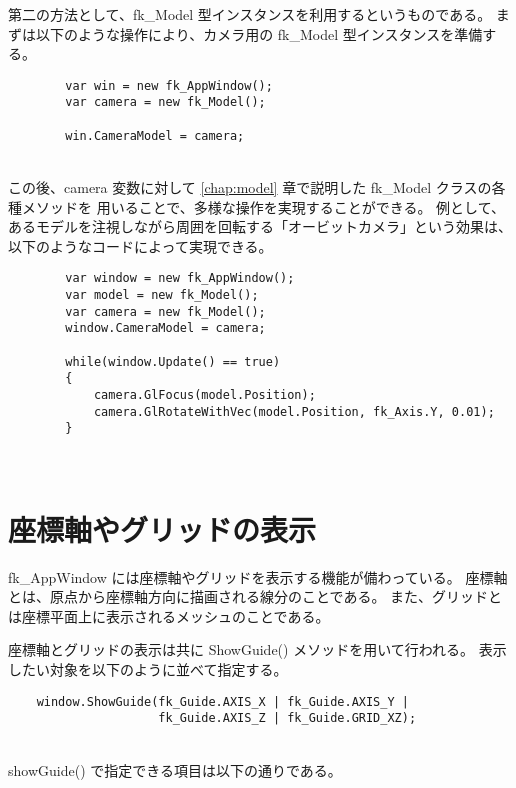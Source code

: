 第二の方法として、fk\_Model 型インスタンスを利用するというものである。
まずは以下のような操作により、カメラ用の fk\_Model 型インスタンスを準備する。
\\
\begin{breakbox}
\begin{verbatim}
        var win = new fk_AppWindow();
        var camera = new fk_Model();

        win.CameraModel = camera;
\end{verbatim}
\end{breakbox}
~ \\
この後、camera 変数に対して \ref{chap:model} 章で説明した fk\_Model クラスの各種メソッドを
用いることで、多様な操作を実現することができる。
例として、あるモデルを注視しながら周囲を回転する「オービットカメラ」という効果は、
以下のようなコードによって実現できる。
\\
\begin{breakbox}
\begin{verbatim}
        var window = new fk_AppWindow();
        var model = new fk_Model();
        var camera = new fk_Model();
        window.CameraModel = camera;

        while(window.Update() == true)
        {
            camera.GlFocus(model.Position);
            camera.GlRotateWithVec(model.Position, fk_Axis.Y, 0.01);
        }
\end{verbatim}
\end{breakbox}
~ \\

\section{座標軸やグリッドの表示}
fk\_AppWindow には座標軸やグリッドを表示する機能が備わっている。
座標軸とは、原点から座標軸方向に描画される線分のことである。
また、グリッドとは座標平面上に表示されるメッシュのことである。

座標軸とグリッドの表示は共に ShowGuide() メソッドを用いて行われる。
表示したい対象を以下のように並べて指定する。
\\
\begin{screen}
\begin{verbatim}
    window.ShowGuide(fk_Guide.AXIS_X | fk_Guide.AXIS_Y |
                     fk_Guide.AXIS_Z | fk_Guide.GRID_XZ);
\end{verbatim}
\end{screen}
~ \\
showGuide() で指定できる項目は以下の通りである。

